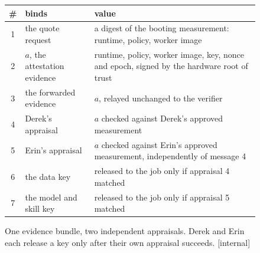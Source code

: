 \begin{figure}[H]
\begin{tikzpicture}[pd figure,x=1cm,y=1cm]
\end{tikzpicture}
\vspace{4pt}
\footnotesize
{}
\begin{tabularx}{\linewidth}{@{}c >{\raggedright\arraybackslash}p{2.4cm} >{\raggedright\arraybackslash}X@{}}
\toprule
\# & binds & value \\
\midrule
1 & the quote request & a digest of the booting measurement: runtime, policy, worker image \\
2 & $a$, the attestation evidence & runtime, policy, worker image, key, nonce and epoch, signed by the hardware root of trust \\
3 & the forwarded evidence & $a$, relayed unchanged to the verifier \\
4 & Derek's appraisal & $a$ checked against Derek's approved measurement \\
5 & Erin's appraisal & $a$ checked against Erin's approved measurement, independently of message 4 \\
6 & the data key & released to the job only if appraisal 4 matched \\
7 & the model and skill key & released to the job only if appraisal 5 matched \\
\bottomrule
\end{tabularx}
\caption{One evidence bundle, two independent appraisals. Derek and Erin
each release a key only after their own appraisal succeeds. [internal]}
\label{fig:sealed-dual-attestation}
\end{figure}
